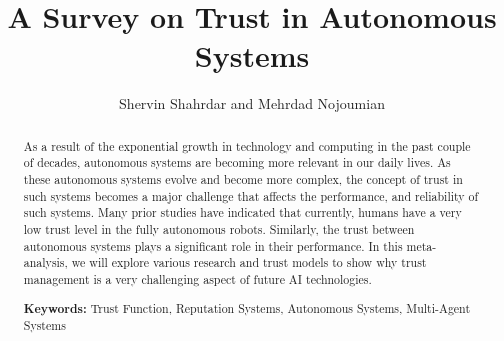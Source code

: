 \documentclass[runningheads,a4paper]{llncs}
\begin{document}

%
\frontmatter          %
%
\pagestyle{headings}  %
%
\mainmatter              %
%
\title{A Survey on Trust in Autonomous Systems \\ 
}
%
%
\author{\large Shervin Shahrdar and Mehrdad Nojoumian   %
}



\maketitle
\begin{abstract}

\noindent As a result of the exponential growth in technology and computing in the past couple of decades, autonomous systems are becoming more relevant in our daily lives. As these autonomous systems evolve and become more complex, the concept of trust in such systems becomes a major challenge that affects the performance, and reliability of such systems. Many prior studies have indicated that currently, humans have a very low trust level in the fully autonomous robots. Similarly, the trust between autonomous systems plays a significant role in their performance. In this meta-analysis, we will explore various research and trust models to show why trust management is a very challenging aspect of future AI technologies.

\vspace{10pt}
\textbf{Keywords:} Trust Function, Reputation Systems, Autonomous Systems, Multi-Agent Systems
\end{abstract}
\end{document}
